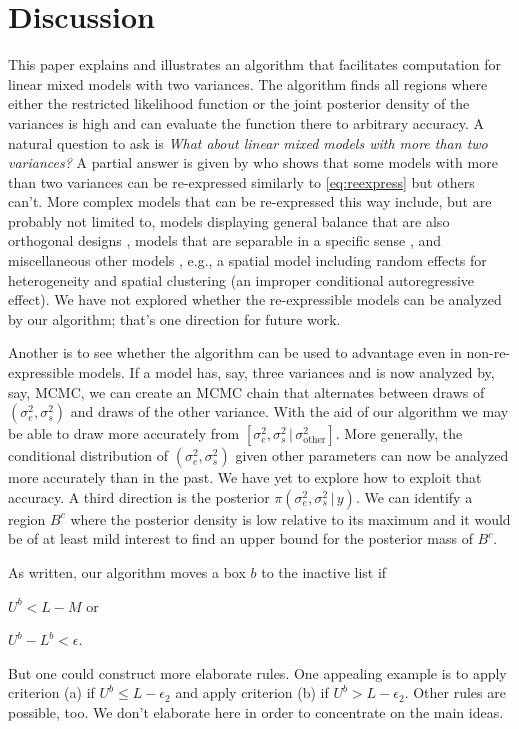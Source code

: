 \documentclass[ejs]{imsart}
\newcommand{\sigssq}{\sigma_s^2}
\newcommand{\sigesq}{\sigma_e^2}
\newcommand{\g}{\,|\,}
\begin{document}
\section{Discussion}
This paper explains and illustrates an algorithm that facilitates computation for linear mixed models with two variances. The algorithm finds all regions where either the restricted likelihood function or the joint posterior density of the variances is high and can evaluate the function there to arbitrary accuracy.  A natural question to ask is \emph{What about linear mixed models with more than two variances?}  A partial answer is given by \cite{hodges:2013} who shows that some models with more than two variances can be re-expressed similarly to \eqref{eq:reexpress} but others can't.  More complex models that can be re-expressed this way include, but are probably not limited to, models displaying general balance that are also orthogonal designs \citep[all balanced ANOVAs plus other models;][]{houtman_speed:1983}, models that are separable in a specific sense \citep[Section 17.1.5]{hodges:2013}, and miscellaneous other models \citep[Section 17.1.5]{hodges:2013}, e.g., a spatial model including random effects for heterogeneity and spatial clustering (an improper conditional autoregressive effect). We have not explored whether the re-expressible models can be analyzed by our algorithm; that's one direction for future work.  

Another is to see whether the algorithm can be used to advantage even in non-re-expressible models.  If a model has, say, three variances and is now analyzed by, say, MCMC, we can create an MCMC chain that alternates between draws of $(\sigesq,\sigssq)$ and draws of the other variance.  With the aid of our algorithm we may be able to draw more accurately from $[\sigesq,\sigssq\g \sigma^2_\text{other}]$.  More generally, the conditional distribution of $(\sigesq,\sigssq)$ given other parameters can now be analyzed more accurately than in the past.  We have yet to explore how to exploit that accuracy.  A third direction is the posterior $\pi(\sigesq,\sigssq\g y)$.  We can identify a region $B^c$ where the posterior density is low relative to its maximum and it would be of at least mild interest to find an upper bound for the posterior mass of $B^c$.

As written, our algorithm moves a box $b$ to the inactive list if
\begin{enumerate*}[label=(\alph*)]
\item $U^b < L-M$ or
\item $U^b - L^b < \epsilon$.
\end{enumerate*}
But one could construct more elaborate rules.  One appealing example is to apply criterion (a) if $U^b \le L-\epsilon_2$ and apply criterion (b) if $U^b > L-\epsilon_2$.  Other rules are possible, too.  We don't elaborate here in order to concentrate on the main ideas.
\end{document}
